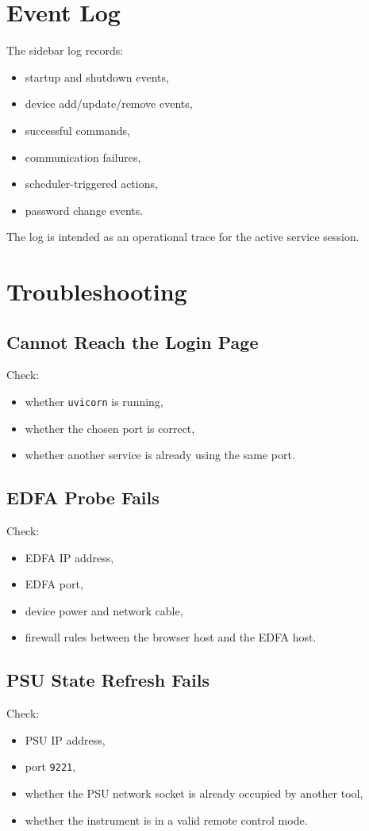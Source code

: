\documentclass[11pt,a4paper]{article}
\begin{document}
\section{Event Log}
The sidebar log records:
\begin{itemize}[leftmargin=1.5em]
    \item startup and shutdown events,
    \item device add/update/remove events,
    \item successful commands,
    \item communication failures,
    \item scheduler-triggered actions,
    \item password change events.
\end{itemize}

The log is intended as an operational trace for the active service session.

\section{Troubleshooting}
\subsection{Cannot Reach the Login Page}
Check:
\begin{itemize}[leftmargin=1.5em]
    \item whether \texttt{uvicorn} is running,
    \item whether the chosen port is correct,
    \item whether another service is already using the same port.
\end{itemize}

\subsection{EDFA Probe Fails}
Check:
\begin{itemize}[leftmargin=1.5em]
    \item EDFA IP address,
    \item EDFA port,
    \item device power and network cable,
    \item firewall rules between the browser host and the EDFA host.
\end{itemize}

\subsection{PSU State Refresh Fails}
Check:
\begin{itemize}[leftmargin=1.5em]
    \item PSU IP address,
    \item port \texttt{9221},
    \item whether the PSU network socket is already occupied by another tool,
    \item whether the instrument is in a valid remote control mode.
\end{itemize}
\end{document}
